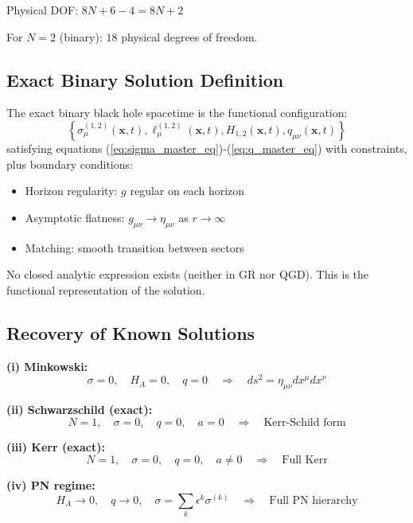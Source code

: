 \documentclass[11pt,a4paper]{article}
\theoremstyle{definition}
\theoremstyle{remark}
\begin{document}
	Physical DOF: $8N + 6 - 4 = 8N + 2$
	
	For $N=2$ (binary): $18$ physical degrees of freedom.
	
	\subsection{Exact Binary Solution Definition}
	
		The exact binary black hole spacetime is the functional configuration:
		\begin{equation}
			\left\{\sigma_\mu^{(1,2)}(\mathbf{x},t), \ell_\mu^{(1,2)}(\mathbf{x},t), H_{1,2}(\mathbf{x},t), q_{\mu\nu}(\mathbf{x},t)\right\}
		\end{equation}
		satisfying equations (\ref{eq:sigma_master_eq})-(\ref{eq:q_master_eq}) with constraints, plus boundary conditions:
		\begin{itemize}
			\item Horizon regularity: $g$ regular on each horizon
			\item Asymptotic flatness: $g_{\mu\nu} \to \eta_{\mu\nu}$ as $r \to \infty$
			\item Matching: smooth transition between sectors
		\end{itemize}
	
	No closed analytic expression exists (neither in GR nor QGD). This is the functional representation of the solution.
	
	\subsection{Recovery of Known Solutions}
	
	\textbf{(i) Minkowski:}
	\begin{equation}
		\sigma=0, \quad H_A=0, \quad q=0 \quad \Rightarrow \quad ds^2 = \eta_{\mu\nu}dx^\mu dx^\nu
	\end{equation}
	
	\textbf{(ii) Schwarzschild (exact):}
	\begin{equation}
		N=1, \quad \sigma=0, \quad q=0, \quad a=0 \quad \Rightarrow \quad \text{Kerr-Schild form}
	\end{equation}
	
	\textbf{(iii) Kerr (exact):}
	\begin{equation}
		N=1, \quad \sigma=0, \quad q=0, \quad a \neq 0 \quad \Rightarrow \quad \text{Full Kerr}
	\end{equation}
	
	\textbf{(iv) PN regime:}
	\begin{equation}
		H_A \to 0, \quad q \to 0, \quad \sigma = \sum_k \epsilon^k\sigma^{(k)} \quad \Rightarrow \quad \text{Full PN hierarchy}
	\end{equation}
	
\end{document}
